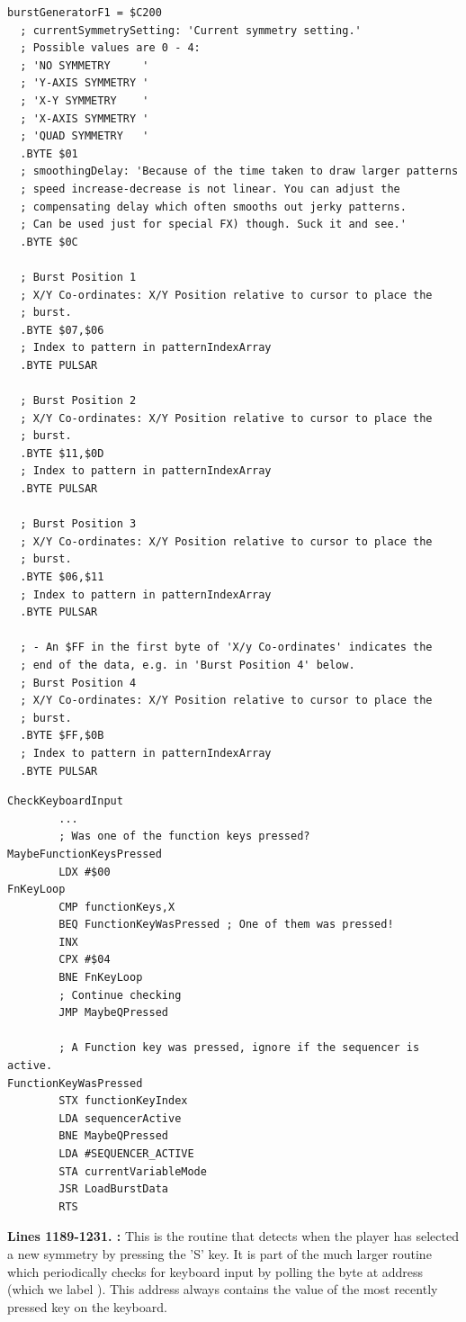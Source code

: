 \begin{lstlisting}[caption=Source code for the F1 Burst.]
burstGeneratorF1 = $C200
  ; currentSymmetrySetting: 'Current symmetry setting.'
  ; Possible values are 0 - 4:
  ; 'NO SYMMETRY     '
  ; 'Y-AXIS SYMMETRY '
  ; 'X-Y SYMMETRY    '
  ; 'X-AXIS SYMMETRY '
  ; 'QUAD SYMMETRY   '
  .BYTE $01
  ; smoothingDelay: 'Because of the time taken to draw larger patterns
  ; speed increase-decrease is not linear. You can adjust the 
  ; compensating delay which often smooths out jerky patterns. 
  ; Can be used just for special FX) though. Suck it and see.'
  .BYTE $0C

  ; Burst Position 1
  ; X/Y Co-ordinates: X/Y Position relative to cursor to place the
  ; burst.
  .BYTE $07,$06
  ; Index to pattern in patternIndexArray
  .BYTE PULSAR

  ; Burst Position 2
  ; X/Y Co-ordinates: X/Y Position relative to cursor to place the
  ; burst.
  .BYTE $11,$0D
  ; Index to pattern in patternIndexArray
  .BYTE PULSAR

  ; Burst Position 3
  ; X/Y Co-ordinates: X/Y Position relative to cursor to place the 
  ; burst.
  .BYTE $06,$11
  ; Index to pattern in patternIndexArray
  .BYTE PULSAR

  ; - An $FF in the first byte of 'X/y Co-ordinates' indicates the
  ; end of the data, e.g. in 'Burst Position 4' below.
  ; Burst Position 4
  ; X/Y Co-ordinates: X/Y Position relative to cursor to place the 
  ; burst.
  .BYTE $FF,$0B
  ; Index to pattern in patternIndexArray
  .BYTE PULSAR

\end{lstlisting}

\clearpage
\begin{lstlisting}
CheckKeyboardInput   
        ...
        ; Was one of the function keys pressed?
MaybeFunctionKeysPressed   
        LDX #$00
FnKeyLoop   
        CMP functionKeys,X
        BEQ FunctionKeyWasPressed ; One of them was pressed!
        INX 
        CPX #$04
        BNE FnKeyLoop
        ; Continue checking
        JMP MaybeQPressed

        ; A Function key was pressed, ignore if the sequencer is active.
FunctionKeyWasPressed   
        STX functionKeyIndex
        LDA sequencerActive
        BNE MaybeQPressed
        LDA #SEQUENCER_ACTIVE
        STA currentVariableMode
        JSR LoadBurstData
        RTS 
\end{lstlisting}
\clearpage

\textbf{Lines 1189-1231. :} This is the routine that detects when the player has selected a new
symmetry by pressing the 'S' key. It is part of the much larger routine  which periodically checks
for keyboard input by polling the byte at address  (which we label ). This address always
contains the value of the most recently pressed key on the keyboard.

